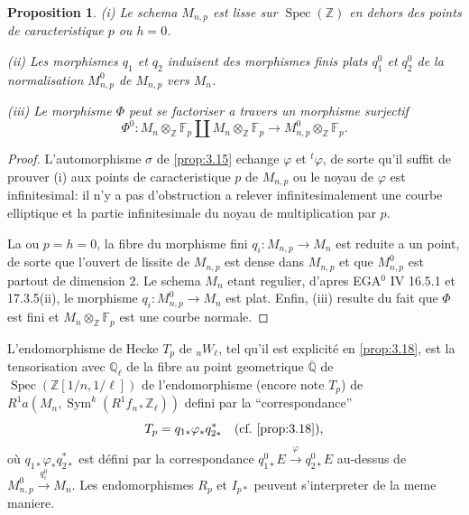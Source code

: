 \documentclass[11pt,reqno]{amsart}
\theoremstyle{plain}
\newtheorem{proposition}[theorem]{Proposition}
\theoremstyle{remark}
\DeclareMathOperator{\Sym}{Sym}
\DeclareMathOperator{\Spec}{Spec}
\newcommand{\Z}{\mathbb{Z}}
\newcommand{\Q}{\mathbb{Q}}
\newcommand{\F}{\mathbb{F}}
\numberwithin{equation}{section}
\begin{document}
\begin{proposition}\label{prop:4.4}
\textup{(i)} Le schema $M_{n,p}$ est lisse sur $\Spec(\Z)$ en dehors des points de caracteristique $p$ ou $h = 0$.

\textup{(ii)} Les morphismes $q_1$ et $q_2$ induisent des morphismes finis plats $q_1^0$ et $q_2^0$ de la normalisation $M_{n,p}^0$ de $M_{n,p}$ vers $M_n$.

\textup{(iii)} Le morphisme $\Phi$ peut se factoriser a travers un morphisme surjectif
\[
\Phi^0: M_n \otimes_\Z \F_p \amalg M_n \otimes_\Z \F_p \to M_{n,p}^0 \otimes_\Z \F_p.
\]
\end{proposition}

\begin{proof}
L'automorphisme $\sigma$ de \ref{prop:3.15} echange $\varphi$ et $^t\!\varphi$, de sorte qu'il suffit de prouver (i) aux points de caracteristique $p$ de $M_{n,p}$ ou le noyau de $\varphi$ est infinitesimal: il n'y a pas d'obstruction a relever infinitesimalement une courbe elliptique et la partie infinitesimale du noyau de multiplication par $p$.

La ou $p = h = 0$, la fibre du morphisme fini $q_i: M_{n,p} \to M_n$ est reduite a un point, de sorte que l'ouvert de lissite de $M_{n,p}$ est dense dans $M_{n,p}$ et que $M_{n,p}^0$ est partout de dimension $2$. Le schema $M_n$ etant regulier, d'apres EGA$^0$ IV 16.5.1 et 17.3.5(ii), le morphisme $q_i: M_{n,p}^0 \to M_n$ est plat. Enfin, (iii) resulte du fait que $\Phi$ est fini et $M_n \otimes_\Z \F_p$ est une courbe normale.
\end{proof}

L'endomorphisme de Hecke $T_p$ de ${}_nW_\ell$, tel qu'il est explicit\'e en \ref{prop:3.18}, est la tensorisation avec $\Q_\ell$ de la fibre au point geometrique $\overline{\Q}$ de $\Spec(\Z[1/n, 1/\ell])$ de l'endomorphisme (encore note $T_p$) de $R^1a(M_n, \Sym^k(R^1f_{n*}\Z_\ell))$ defini par la ``correspondance''
\begin{equation}\label{eq:4.5}
T_p = q_{1*} \varphi_* q_{2*}^* \quad \text{(cf.~\ref{prop:3.18})},
\end{equation}
o\`u $q_{1*}\varphi_*q_{2*}^*$ est d\'efini par la correspondance $q_{1*}^0 E \xrightarrow{\varphi} q_{2*}^0 E$ au-dessus de $M_{n,p}^0 \xrightarrow{q_i^0} M_n$.
Les endomorphismes $R_p$ et $I_{p*}$ peuvent s'interpreter de la meme maniere.
\end{document}

